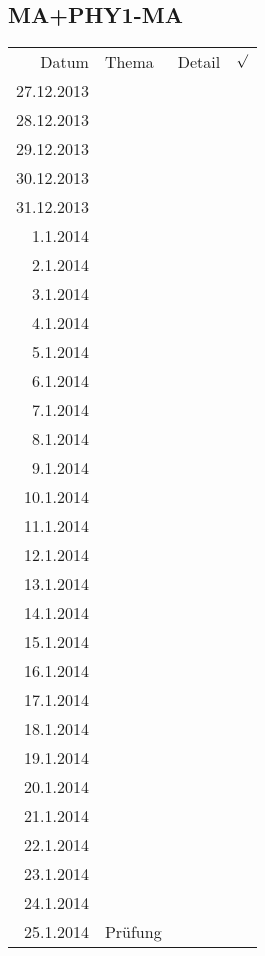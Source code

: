 \subsection{MA+PHY1-MA}
\begin{tabular}{r l p{} l}
\rowcolor{lgray} Datum       & Thema         & Detail & $\surd$ \\
\rowcolor{white}  27.12.2013 &               &  &  \\
\rowcolor{lgray}  28.12.2013 &               &  &  \\
\rowcolor{white}  29.12.2013 &               &  &  \\
\rowcolor{lgray}  30.12.2013 &               &  &  \\
\rowcolor{white}  31.12.2013 &               &  &  \\
\rowcolor{lgray}    1.1.2014 &               &  &  \\
\rowcolor{white}    2.1.2014 &               &  &  \\
\rowcolor{lgray}    3.1.2014 &               &  &  \\
\rowcolor{white}    4.1.2014 &               &  &  \\
\rowcolor{lgray}    5.1.2014 &               &  &  \\
\rowcolor{white}    6.1.2014 &               &  &  \\
\rowcolor{lgray}    7.1.2014 &               &  &  \\
\rowcolor{white}    8.1.2014 &               &  &  \\
\rowcolor{lgray}    9.1.2014 &               &  &  \\
\rowcolor{white}   10.1.2014 &               &  &  \\
\rowcolor{lgray}   11.1.2014 &               &  &  \\
\rowcolor{white}   12.1.2014 &               &  &  \\
\rowcolor{lgray}   13.1.2014 &               &  &  \\
\rowcolor{white}   14.1.2014 &               &  &  \\
\rowcolor{lgray}   15.1.2014 &               &  &  \\
\rowcolor{white}   16.1.2014 &               &  &  \\
\rowcolor{lgray}   17.1.2014 &               &  &  \\
\rowcolor{white}   18.1.2014 &               &  &  \\
\rowcolor{lgray}   19.1.2014 &               &  &  \\
\rowcolor{white}   20.1.2014 &               &  &  \\
\rowcolor{lgray}   21.1.2014 &               &  &  \\
\rowcolor{white}   22.1.2014 &               &  &  \\
\rowcolor{lgray}   23.1.2014 &               &  &  \\
\rowcolor{white}   24.1.2014 &               &  &  \\
\rowcolor{lgray}   25.1.2014 & Prüfung       &  &  \\
\end{tabular}

